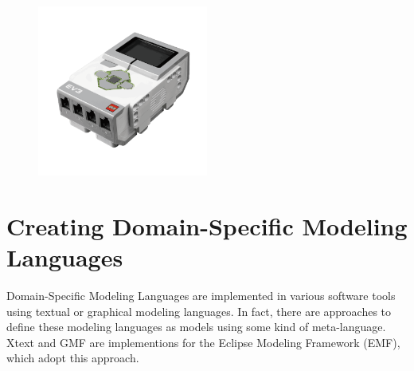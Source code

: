 \documentclass[runningheads,a4paper]{llncs}
\begin{document}
      \begin{figure}[H]
	        \centering
      \includegraphics[width=0.5\textwidth]{images/ev3brick.png}
	    \label{fig:ev3pbrick}
      \end{figure}



    
    \newpage
    \section{Creating Domain-Specific Modeling Languages}
    Domain-Specific Modeling Languages are implemented in various software tools using textual or graphical modeling languages.
    In fact, there are approaches to define these modeling languages as models using some kind of meta-language.
    Xtext and GMF are implementions for the Eclipse Modeling Framework (EMF), which adopt this approach.
    
\end{document}
